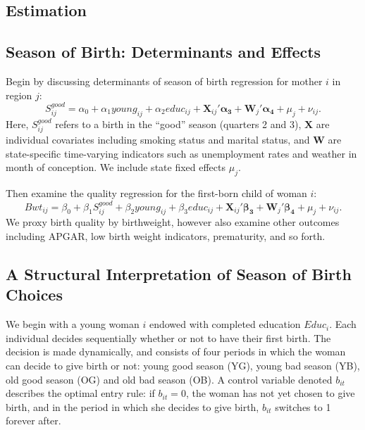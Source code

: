 \documentclass[a4paper, 11 pt]{article}
\theoremstyle{plain}
\begin{document}
\begin{spacing}{1.2}
\section{Estimation}
\subsection{Season of Birth: Determinants and Effects}

Begin by discussing determinants of season of birth regression for mother $i$ in 
region $j$:
\begin{equation}
\label{eqn:season}
S^{good}_{ij} = \alpha_0 + \alpha_1 young_{ij} + \alpha_2 educ_{ij}  + 
\mathbf{X}_{ij}'\mathbf{\alpha_3} + \mathbf{W}_{j}'\mathbf{\alpha_4} + \mu_j +\nu_{ij}. 
\end{equation}
Here, $S^{good}_{ij}$ refers to a birth in the ``good'' season (quarters 2 and 3),
$\mathbf{X}$ are individual covariates including smoking status and marital status,
and $\mathbf{W}$ are state-specific time-varying indicators such as unemployment
rates and weather in month of conception.  We include state fixed effects $\mu_j$.

Then examine the quality regression for the first-born child of woman $i$:
\begin{equation}
\label{eqn:quality}
Bwt_{ij} = \beta_0 + \beta_1 S^{good}_{ij} + \beta_2 young_{ij} + \beta_3 educ_{ij}  + 
\mathbf{X}_{ij}'\mathbf{\beta_3} + \mathbf{W}_{j}'\mathbf{\beta_4} + \mu_j +\nu_{ij}. 
\end{equation}
We proxy birth quality by birthweight, however also examine other outcomes 
including APGAR, low birth weight indicators, prematurity, and so forth.


\subsection{A Structural Interpretation of Season of Birth Choices}
We begin with a young woman $i$ endowed with completed education $Educ_i$.  Each
individual decides sequentially whether or not to have their first birth.  The 
decision is made dynamically, and consists of four periods in which the woman 
can decide to give birth or not: young good season (YG), young bad season (YB), 
old good season (OG) and old bad season (OB). A control variable denoted $b_{it}$ 
describes the optimal entry rule: if $b_{it}=0$, the woman has not yet chosen to 
give birth, and in the period in which she decides to give birth, $b_{it}$ 
switches to 1 forever after. 


\end{spacing}
\end{document}
